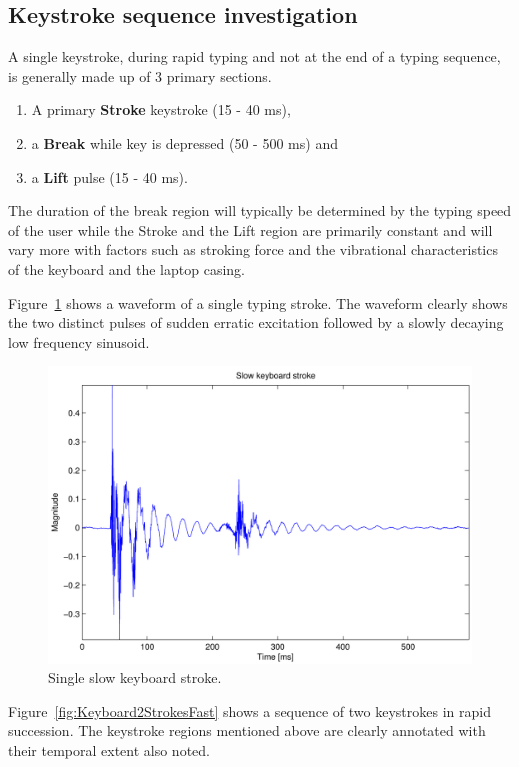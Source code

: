 \subsection{Keystroke sequence investigation}
A single keystroke, during rapid typing and not at the end of a typing sequence, is generally made up of 3 primary sections.
\begin{enumerate}
  \item A primary \textbf{Stroke} keystroke (15 - 40 ms),
  \item a \textbf{Break} while key is depressed (50 - 500 ms) and
  \item a \textbf{Lift} pulse (15 - 40 ms).
\end{enumerate}
The duration of the break region will typically be determined by the typing speed of the user while the Stroke and the Lift region are primarily constant and will vary more with factors such as stroking force and the vibrational characteristics of the keyboard and the laptop casing.

Figure~\ref{fig:KeyboardStrokeSlow} shows a waveform of a single typing stroke. The waveform clearly shows the two distinct pulses of sudden erratic excitation followed by a slowly decaying low frequency sinusoid.

\begin{figure}[!] %
\centering
\includegraphics[width=120mm]{KeyboardStrokeSlow.pdf}
\caption{Single slow keyboard stroke.}\label{fig:KeyboardStrokeSlow}
\end{figure}

Figure~\ref{fig:Keyboard2StrokesFast} shows a sequence of two keystrokes in rapid succession. The keystroke regions mentioned above are clearly annotated with their temporal extent also noted.

